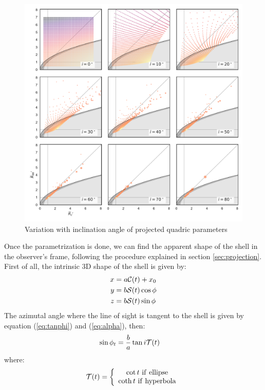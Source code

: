\begin{figure}
  \centering
  \includegraphics[width=\linewidth]{figs/projected-R90-Rc-snapshots}
  \caption{Variation with inclination angle of projected quadric parameters}
  \label{fig:projected-R90-Rc-snapshots}
\end{figure}
Once the parametrization is done, we can find the apparent shape of
the shell in the observer's frame, following the procedure explained
in section \ref{sec:projection}.  First of all, the intrinsic 3D shape of the shell is given by:
\begin{align}
x &= a\mathcal{C}(t)+x_0 \\ 
y &= b\mathcal{S}(t)\cos\phi \\
z &=  b\mathcal{S}(t)\sin\phi
\end{align}
The azimutal angle where the line of sight is tangent to the shell is given by equation (\ref{eq:tanphi}) and (\ref{eq:alpha}), then:
\begin{align}
\sin\phi_t &= \frac{b}{a}\tan i\mathcal{T}(t) 
\end{align}
where:
\begin{align}
\mathcal{T}(t) = \left\lbrace \begin{array}{c}
\cot t ~\mathrm{if~ellipse} \\
\coth t ~\mathrm{if~hyperbola}
\end{array}\right.
\end{align}

